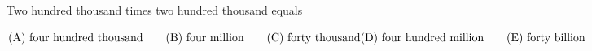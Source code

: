 

Two hundred thousand times two hundred thousand equals

$\text{(A)}\ \text{four hundred thousand} \qquad  \text{(B)}\ \text{four million} \qquad  \text{(C)}\ \text{forty thousand} \qquad \\ \text{(D)}\ \text{four hundred million} \qquad  \text{(E)}\ \text{forty billion}$
